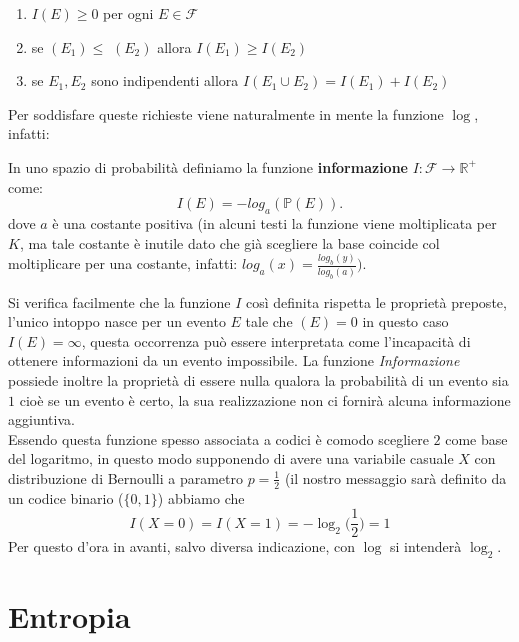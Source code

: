 \begin{enumerate} 
\item $I(E)\geq 0$ per ogni $E\in \mathcal{F}$
\item se \p$(E_1)\leq $ \p$(E_2)$ allora $I(E_1)\geq I(E_2)$ 
\item se $E_1,E_2$ sono indipendenti allora $I(E_1\cup E_2)=I(E_1)+ I(E_2)$
\end{enumerate} 
Per soddisfare queste richieste viene naturalmente in mente la funzione $\log$, infatti:
\begin{defi}
In uno spazio di probabilità \spacep definiamo la funzione \textbf{informazione} $I: \mathcal{F}\to \mathbb{R}^+$ come:
\begin{equation}
I(E)=-log_a(\mathbb{P} (E)).
\end{equation}
dove $a$ è una costante positiva (in alcuni testi la funzione viene moltiplicata per $K$,  ma tale costante è inutile dato che già scegliere la base coincide col moltiplicare per una costante, infatti: $log_a(x)=\frac{log_b(y)}{log_b(a)} \bigg)$.
\end{defi}

Si verifica facilmente che la funzione $I$ così definita rispetta le proprietà preposte, l'unico intoppo nasce per un evento $E$ tale che \p $(E)=0$ in questo caso $I(E)=\infty$, questa occorrenza può essere interpretata come l'incapacità di ottenere informazioni da un evento impossibile. La funzione \textit{Informazione} possiede inoltre la proprietà di essere nulla qualora la probabilità di un evento sia $1$ cioè se un evento è certo, la sua realizzazione non ci fornirà alcuna informazione aggiuntiva.\\
Essendo questa funzione spesso associata a codici è comodo scegliere $2$ come base del logaritmo, in questo modo supponendo di avere una variabile casuale $X$ con distribuzione di Bernoulli a parametro $p=\frac{1}{2}$ (il nostro messaggio sarà definito da un codice binario ($\{ 0, 1 \}$) abbiamo che 
\begin{equation}
I(X=0)=I(X=1)=-\log_2 \bigg(\frac{1}{2} \bigg ) =1
\end{equation}
Per questo d'ora in avanti, salvo diversa indicazione, con $\log$ si intenderà $\log_2$.

\section{Entropia}
\label{sec:Entropia}

